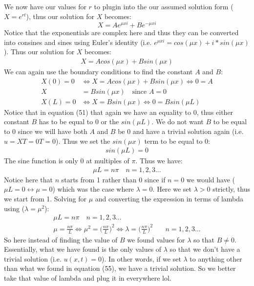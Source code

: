\documentclass[11pt]{article}
\begin{document}
We now have our values for $r$ to plugin into the our assumed solution form ($X=e^{rt}$), thus our solution for $X$ becomes:
\begin{equation}
	X=Ae^{\mu xi} + Be^{-\mu xi}
\end{equation}
Notice that the exponentials are complex here and thus they can be converted into consines and sines using Euler's identity (i.e. $e^{\mu x i} = cos(\mu x)+i*sin(\mu x)$). Thus our solution for $X$ becomes:
\begin{align}
	X=Acos(\mu x)+Bsin(\mu x)
\end{align}
We can again use the boundary conditions to find the constant $A$ and $B$:
\begin{align}
	X(0)=0 & \Longleftrightarrow X=Acos(\mu x)+Bsin(\mu x) \Longleftrightarrow 0 = A\\
	X &= Bsin(\mu x) \quad \text{since $A=0$}\\
	X(L)=0 & \Longleftrightarrow X = Bsin(\mu x) \Longleftrightarrow 0=Bsin(\mu L)
\end{align}
Notice that in equation (51) that again we have an equality to 0, thus either constant $B$ has to be equal to 0 or the $sin(\mu L)$. We do not want $B$ to be equal to 0 since we will have both $A$ and $B$ be 0 and have a trivial solution again (i.e. $u=XT=0T=0$). Thus we set the $sin(\mu x)$ term to be equal to 0:
\begin{align}
	sin(\mu L) = 0
\end{align}
The sine function is only 0 at multiples of $\pi$. Thus we have:
\begin{align}
	\mu L = n\pi \quad n=1, 2, 3 ...
\end{align}
Notice here that $n$ starts from 1 rather than 0 since if $n=0$ we would have ($\mu L = 0 \leftrightarrow \mu = 0$) which was the case where $\lambda = 0$. Here we set $\lambda>0$ strictly, thus we start from 1. Solving for $\mu$ and converting the expression in terms of lambda using ($\lambda=\mu^2$):
\begin{align}
	\mu L = n\pi \quad n=1, 2, 3 ...\\
	\mu = \frac{n\pi}{L} \Leftrightarrow \mu^2 = \bigg(\frac{n\pi}{L}\bigg)^2 \Leftrightarrow \lambda = \bigg(\frac{n\pi}{L}\bigg)^2 &\quad n=1,2,3...
\end{align}
So here instead of finding the value of $B$ we found values for $\lambda$ so that $B \neq 0$. Essentially, what we have found is the only values of $\lambda$ so that we don't have a trivial solution (i.e. $u(x,t)=0$). In other words, if we set $\lambda$ to anything other than what we found in equation (55), we have a trivial solution. So we better take that value of lambda and plug it in everywhere lol. 
\end{document}
